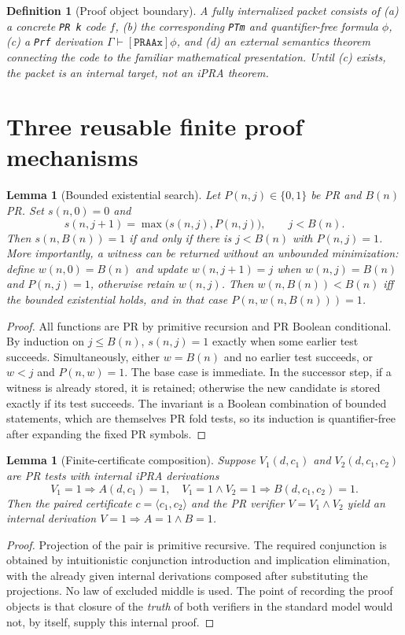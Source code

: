 \documentclass[11pt]{article}
\newtheorem{lemma}[theorem]{Lemma}
\newtheorem{definition}[theorem]{Definition}
\begin{document}
\begin{definition}[Proof object boundary]
A fully internalized packet consists of (a) a concrete \texttt{PR k} code $f$, (b) the corresponding \texttt{PTm} and quantifier-free formula $\phi$, (c) a \texttt{Prf} derivation $\Gamma\vdash[\texttt{PRAAx}]\phi$, and (d) an external semantics theorem connecting the code to the familiar mathematical presentation.  Until (c) exists, the packet is an internal \emph{target}, not an iPRA theorem.
\end{definition}

\section{Three reusable finite proof mechanisms}
\begin{lemma}[Bounded existential search]
Let $P(n,j)\in\{0,1\}$ be PR and $B(n)$ PR. Set $s(n,0)=0$ and
\[s(n,j+1)=\max\bigl(s(n,j),P(n,j)\bigr),\qquad j<B(n).\]
Then $s(n,B(n))=1$ if and only if there is $j<B(n)$ with $P(n,j)=1$. More importantly, a witness can be returned without an unbounded minimization: define $w(n,0)=B(n)$ and update $w(n,j+1)=j$ when $w(n,j)=B(n)$ and $P(n,j)=1$, otherwise retain $w(n,j)$. Then $w(n,B(n))<B(n)$ iff the bounded existential holds, and in that case $P(n,w(n,B(n)))=1$.
\end{lemma}
\begin{proof}
All functions are PR by primitive recursion and PR Boolean conditional. By induction on $j\le B(n)$, $s(n,j)=1$ exactly when some earlier test succeeds. Simultaneously, either $w=B(n)$ and no earlier test succeeds, or $w<j$ and $P(n,w)=1$. The base case is immediate. In the successor step, if a witness is already stored, it is retained; otherwise the new candidate is stored exactly if its test succeeds. The invariant is a Boolean combination of bounded statements, which are themselves PR fold tests, so its induction is quantifier-free after expanding the fixed PR symbols. \end{proof}
\begin{lemma}[Finite-certificate composition]
Suppose $V_1(d,c_1)$ and $V_2(d,c_1,c_2)$ are PR tests with internal iPRA derivations
\[V_1=1\Rightarrow A(d,c_1)=1,\quad V_1=1\land V_2=1\Rightarrow B(d,c_1,c_2)=1.\]
Then the paired certificate $c=\langle c_1,c_2\rangle$ and the PR verifier $V=V_1\wedge V_2$ yield an internal derivation $V=1\Rightarrow A=1\land B=1$.
\end{lemma}
\begin{proof}
Projection of the pair is primitive recursive. The required conjunction is obtained by intuitionistic conjunction introduction and implication elimination, with the already given internal derivations composed after substituting the projections. No law of excluded middle is used. The point of recording the proof objects is that closure of the \emph{truth} of both verifiers in the standard model would not, by itself, supply this internal proof.\end{proof}
\end{document}
